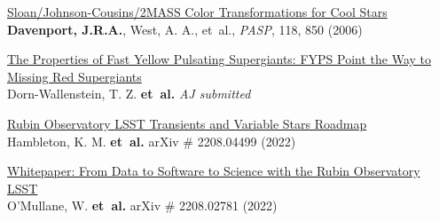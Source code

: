 \documentclass{article}
\begin{document}
\begin{llist}
\begin{etaremune}[leftmargin=10pt]
\item{\sc \href{http://adsabs.harvard.edu/abs/2006PASP..118.1679D}{\color{NavyBlue}Sloan/Johnson-Cousins/2MASS Color Transformations for Cool Stars}}\\
{\bf Davenport, J.R.A.}, West, A. A., et~al., {\em PASP}, 118, 850 (2006)
\end{etaremune}








\begin{etaremune}[leftmargin=10pt]


%
%


\item{\sc \href{https://arxiv.org/abs/2206.11917}{\color{NavyBlue}The Properties of Fast Yellow Pulsating Supergiants: FYPS Point the Way to Missing Red Supergiants}}\\
Dorn-Wallenstein, T. Z. {\bf et~al.} {\em AJ submitted}


\item{\sc  \href{https://arxiv.org/abs/2208.04499}{\color{NavyBlue}Rubin Observatory LSST Transients and Variable Stars Roadmap}}\\
Hambleton, K. M. {\bf et~al.}  arXiv \# 2208.04499 (2022)

\item{\sc  \href{https://arxiv.org/abs/2208.02781}{\color{NavyBlue}Whitepaper: From Data to Software to Science with the Rubin Observatory LSST}}\\
O'Mullane, W. {\bf et~al.}  arXiv \# 2208.02781 (2022)




\end{etaremune}
\end{llist}
\end{document}
